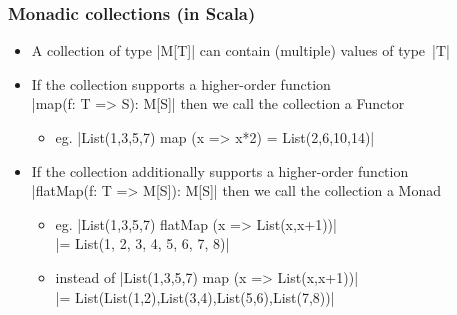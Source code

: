 \documentclass[mathserif,handout]{beamer}
\begin{document}

\begin{frame}[fragile]
  \frametitle{Monadic collections (in Scala)}
  \begin{itemize}
  \item A collection of type |M[T]| can contain (multiple) values of type~|T|
  \item If the collection supports a higher-order function\\
    |map(f: T => S): M[S]| then we call the collection a \alert{Functor}
    \begin{itemize}
    \item eg. |List(1,3,5,7) map (x => x*2) = List(2,6,10,14)|
    \end{itemize}
  \item If the collection additionally supports a higher-order function\\
    |flatMap(f: T => M[S]): M[S]| then we call the collection a \alert{Monad}
    \begin{itemize}
    \item eg. |List(1,3,5,7) flatMap (x => List(x,x+1))|\\
      \hspace{6ex} |= List(1, 2, 3, 4, 5, 6, 7, 8)|
    \item instead of |List(1,3,5,7) map (x => List(x,x+1))|\\
      |= List(List(1,2),List(3,4),List(5,6),List(7,8))|
    \end{itemize}
  \end{itemize}
\end{frame}
\end{document}
